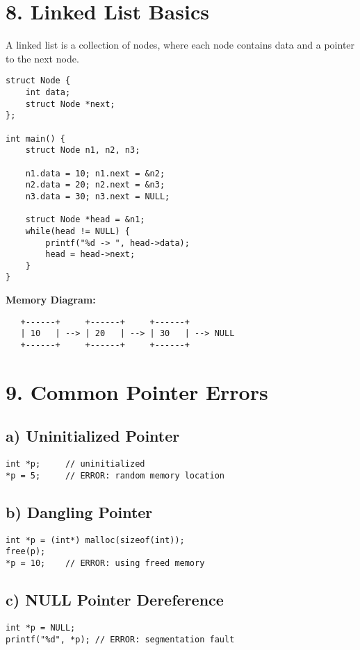 \documentclass[a4paper,12pt]{article}
\begin{document}
\section*{8. Linked List Basics}
A linked list is a collection of nodes, where each node contains data and a pointer to the next node.  

\begin{lstlisting}
struct Node {
    int data;
    struct Node *next;
};

int main() {
    struct Node n1, n2, n3;

    n1.data = 10; n1.next = &n2;
    n2.data = 20; n2.next = &n3;
    n3.data = 30; n3.next = NULL;

    struct Node *head = &n1;
    while(head != NULL) {
        printf("%d -> ", head->data);
        head = head->next;
    }
}
\end{lstlisting}

\textbf{Memory Diagram:}
\begin{verbatim}
   +------+     +------+     +------+
   | 10   | --> | 20   | --> | 30   | --> NULL
   +------+     +------+     +------+
\end{verbatim}

\section*{9. Common Pointer Errors}
\subsection*{a) Uninitialized Pointer}
\begin{lstlisting}
int *p;     // uninitialized
*p = 5;     // ERROR: random memory location
\end{lstlisting}

\subsection*{b) Dangling Pointer}
\begin{lstlisting}
int *p = (int*) malloc(sizeof(int));
free(p);
*p = 10;    // ERROR: using freed memory
\end{lstlisting}

\subsection*{c) NULL Pointer Dereference}
\begin{lstlisting}
int *p = NULL;
printf("%d", *p); // ERROR: segmentation fault
\end{lstlisting}
\end{document}
